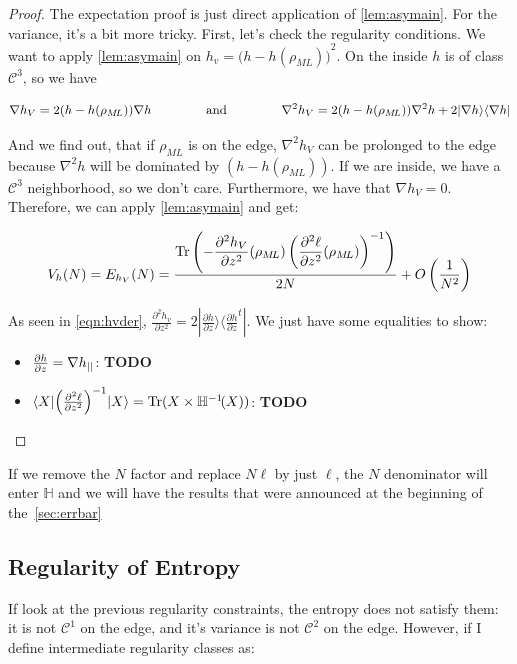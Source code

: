 \documentclass[10pt,a4paper]{report}
\theoremstyle{plain}
\theoremstyle{definition}
\theoremstyle{remark}
\newcommand{\TODO}{\textbf{TODO}}
\newcommand{\ket}[1]{|#1\rangle}
\newcommand{\bra}[1]{\langle#1|}
\newcommand{\dpar}[2]{\frac{\partial{#1}}{\partial{#2}}}
\newcommand{\dparn}[3]{\frac{\partial^{#3} {#1}}{\partial{#2}^{#3}}}
\DeclareMathOperator{\Tr}{Tr}
\newcommand{\class}[1]{{\mathscr{C}^{#1}}}
\newcommand{\ml}{_{M\!L}}
\newcommand{\gap}{\hspace{1.5cm}}
\begin{document}
\begin{proof}
  The expectation proof is just direct application of \cref{lem:asymain}. For
  the variance, it's a bit more tricky. First, let's check the regularity
  conditions. We want to apply \cref{lem:asymain} on $h_v = {\big(h - h(\rho\ml)\big)}^2$.
  On the inside $h$ is of class $\class 3$, so we have

  \begin{equation}\label{eqn:hvder}
  \nabla h_V = 2 (h - h(\rho\ml)) \nabla h \gap \text{and}\gap \nabla^2 h_V =
    2(h-h(\rho\ml)) \nabla^2 h
    + 2 \ket {\nabla h} \bra {\nabla h}
\end{equation}

  And we find out, that if $\rho\ml$ is on the edge,
  $\nabla^2 h_V$ can be prolonged to the edge because $\nabla^2 h$
  will be dominated by $(h - h(\rho\ml))$. If we are inside, we have a $\class 3$
  neighborhood, so we don't care. Furthermore, we have that $\nabla h_V = 0$.
  Therefore, we can apply \cref{lem:asymain} and get:

  \[V_h(N) = E_{h_V}(N) =
    \frac{\displaystyle \Tr \left( - \dparn {h_V} z 2 (\rho\ml)
        \left( \dparn \ell z 2(\rho\ml)\right)\inv\right)}
    {2N}
    + O\left(\frac 1 {N^2}\right)\]

  As seen in \cref{eqn:hvder}, $\dparn {h_v} z 2 = 2 \ket {\dpar h z} \bra{\dpar h z^t}$. We
  just have some equalities to show:

  \begin{itemize}
    \item $\dpar h z = \nabla h\pr$: \TODO{}

    \item $\bra X {\left (\dparn \ell z 2\right)}^{-1}
      \ket X = \Tr(X\times \mathbb H\inv\!(X))$: \TODO{}

  \end{itemize}

\end{proof}


If we remove the $N$ factor and replace $N\ell$ by just $\ell$, the $N$
denominator will enter $\mathbb H$ and we will have the results that were announced at
the beginning of the~\cref{sec:errbar}

\subsection{Regularity of Entropy}\label{sec:regentropy}

If look at the previous regularity constraints, the entropy does not satisfy
them: it is not $\class 1$ on the edge, and it's variance is not $\class 2$ on
the edge. However, if I define intermediate regularity classes as:
\end{document}
